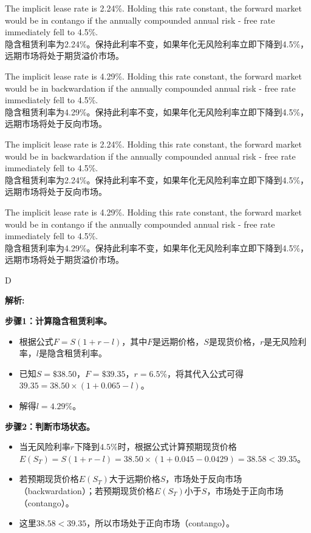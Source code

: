 \documentclass{article}
\newenvironment{explanation}
{\textbf{解析:}\par}
{\par}
\begin{document}
        \begin{choices}
            \item The implicit lease rate is 2.24\%. Holding this rate constant, the forward market would be in contango if the annually compounded annual risk - free rate immediately fell to 4.5\%.\\
            隐含租赁利率为2.24\%。保持此利率不变，如果年化无风险利率立即下降到4.5\%，远期市场将处于期货溢价市场。
            \item The implicit lease rate is 4.29\%. Holding this rate constant, the forward market would be in backwardation if the annually compounded annual risk - free rate immediately fell to 4.5\%.\\
            隐含租赁利率为4.29\%。保持此利率不变，如果年化无风险利率立即下降到4.5\%，远期市场将处于反向市场。
            \item The implicit lease rate is 2.24\%. Holding this rate constant, the forward market would be in backwardation if the annually compounded annual risk - free rate immediately fell to 4.5\%.\\
            隐含租赁利率为2.24\%。保持此利率不变，如果年化无风险利率立即下降到4.5\%，远期市场将处于反向市场。
            \item The implicit lease rate is 4.29\%. Holding this rate constant, the forward market would be in contango if the annually compounded annual risk - free rate immediately fell to 4.5\%.\\
            隐含租赁利率为4.29\%。保持此利率不变，如果年化无风险利率立即下降到4.5\%，远期市场将处于期货溢价市场。
        \end{choices}
        
        \begin{correctanswer}
            D
        \end{correctanswer}
        
        \begin{explanation}
        \textbf{步骤1：计算隐含租赁利率。}
        \begin{itemize}
            \item 根据公式\(F = S(1 + r - l)\)，其中\(F\)是远期价格，\(S\)是现货价格，\(r\)是无风险利率，\(l\)是隐含租赁利率。
            \item 已知\(S=\$38.50\)，\(F = \$39.35\)，\(r = 6.5\%\)，将其代入公式可得\(39.35=38.50\times(1 + 0.065 - l)\)。
            \item 解得\(l=4.29\%\)。
        \end{itemize}
        \textbf{步骤2：判断市场状态。}
        \begin{itemize}
            \item 当无风险利率\(r\)下降到\(4.5\%\)时，根据公式计算预期现货价格\(E(S_T)=S(1 + r - l)=38.50\times(1 + 0.045-0.0429)=38.58<39.35\)。
            \item 若预期现货价格\(E(S_T)\)大于远期价格\(S\)，市场处于反向市场（backwardation）；若预期现货价格\(E(S_T)\)小于\(S\)，市场处于正向市场（contango）。
            \item 这里\(38.58<39.35\)，所以市场处于正向市场（contango）。
        \end{itemize}
        \end{explanation}
        
\end{document}
